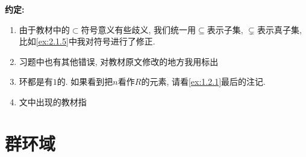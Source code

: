 \textbf{约定:} \begin{enumerate}
    \item 由于教材中的$\subset$符号意义有些歧义, 我们统一用$\subseteq$表示子集, $\subsetneq$表示真子集, 比如\ref{ex:2.1.5}中我对符号进行了修正.
    \item 习题中也有其他错误, 对教材原文修改的地方我用标出
    \item 环都是有$1$的. 如果看到把$n$看作$R$的元素, 请看\ref{ex:1.2.1}最后的注记.
    \item 文中出现的教材指\cite{2022抽象代数}
\end{enumerate}

\section{群环域}



